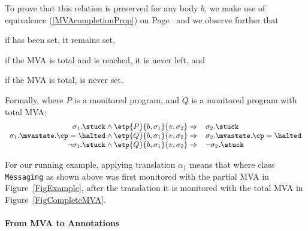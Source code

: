 To prove that this relation is preserved for any body \(b\), we make
use of equivalence (\ref{MVAcompletionProp}) on
Page~\pageref{MVAcompletionProp} and we observe further that
\begin{inparaenum}
\item if \stuck has been set, it remains set,
\item if the MVA is total and \halted is reached, it is never left, and
\item if the MVA is total, \stuck is never set.
\end{inparaenum} Formally, where \(P\) is a monitored program, and
\(Q\) is a monitored program with total MVA:
\[{\small
\begin{array}[t]{rl}
\sigma_1.\stuck \wedge \etp{P}{b,\sigma_1}{v,\sigma_2} \Rightarrow &
\sigma_2.\stuck \\
\sigma_1.\mvastate.\cp = \halted \wedge
\etp{Q}{b,\sigma_1}{v,\sigma_2} \Rightarrow &
\sigma_2.\mvastate.\cp = \halted \\
\neg \sigma_1.\stuck \wedge \etp{Q}{b,\sigma_1}{v,\sigma_2} \Rightarrow &
\neg \sigma_2.\stuck
\end{array}}
\]

For our running example, applying translation \(\alpha_1\) means that
where class \texttt{Messaging} as shown above was first monitored
with the partial MVA in Figure~\ref{FigExample}, after the translation
it is monitored with the total MVA in Figure~\ref{FigCompleteMVA}.


\paragraph{From MVA to Annotations}

